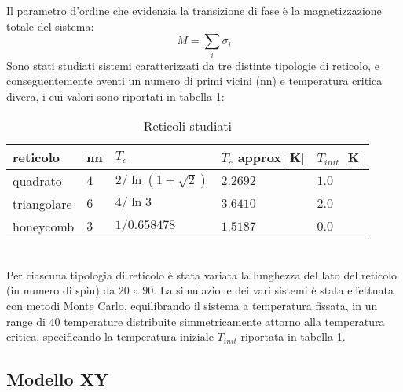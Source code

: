\documentclass{article}
\begin{document}
Il parametro d'ordine che evidenzia la transizione di fase è la magnetizzazione totale del sistema:
\begin{equation}
M=\sum_i \sigma_i
\end{equation}
Sono stati studiati sistemi caratterizzati da tre distinte tipologie di reticolo, e conseguentemente aventi un numero di primi vicini (nn) e temperatura critica divera, i cui valori sono riportati in tabella \ref{tab:lt}:
\begin{table}[h]
\begin{center}
\begin{tabular}{lllll}
\toprule
reticolo & nn & $T_c$ & $T_c$ approx $[$\si{K}$]$ & $T_{init}$ $[$\si{K}$]$\\
\midrule
quadrato & $4$ & $2/ \!\ln{(1+\sqrt{2})}$ & $2.2692$ & $1.0$\\
triangolare & $6$ & $4/\!\ln{3}$ & $3.6410 $ & $2.0$\\
honeycomb & $3$ & $1/\!0.658478$ & $1.5187$ & $0.0$\\
\bottomrule
\end{tabular}
\end{center}
\caption{Reticoli studiati}
\label{tab:lt}
\end{table}\\
Per ciascuna tipologia di reticolo è stata variata la lunghezza del lato del reticolo (in numero di spin) da $20$ a $90$. La simulazione dei vari sistemi è stata effettuata con metodi Monte Carlo, equilibrando il sistema a temperatura fissata, in un range di $40$ temperature distribuite simmetricamente attorno alla temperatura critica, specificando la temperatura iniziale $T_{init}$ riportata in tabella \ref{tab:lt}.
\subsection{Modello XY}







\end{document}
